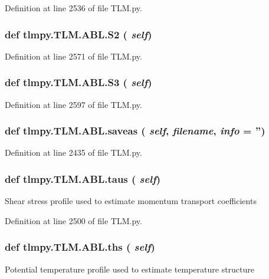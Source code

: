 Definition at line 2536 of file TLM.py.\hypertarget{classtlmpy_1_1TLM_1_1ABL_aa9ff1ee6dd176f30fde1965055b965cf}{
\subsubsection[{S2}]{\setlength{\rightskip}{0pt plus 5cm}def tlmpy.TLM.ABL.S2 ( {\em self})}}
\label{classtlmpy_1_1TLM_1_1ABL_aa9ff1ee6dd176f30fde1965055b965cf}


Definition at line 2571 of file TLM.py.\hypertarget{classtlmpy_1_1TLM_1_1ABL_a5bf1aecd82b5b9916ecebedf39a66aa0}{
\subsubsection[{S3}]{\setlength{\rightskip}{0pt plus 5cm}def tlmpy.TLM.ABL.S3 ( {\em self})}}
\label{classtlmpy_1_1TLM_1_1ABL_a5bf1aecd82b5b9916ecebedf39a66aa0}


Definition at line 2597 of file TLM.py.\hypertarget{classtlmpy_1_1TLM_1_1ABL_a89ac6588f29d2fbd994e80bc25e93ae1}{
\subsubsection[{saveas}]{\setlength{\rightskip}{0pt plus 5cm}def tlmpy.TLM.ABL.saveas ( {\em self}, \/   {\em filename}, \/   {\em info} = {\ttfamily ''})}}
\label{classtlmpy_1_1TLM_1_1ABL_a89ac6588f29d2fbd994e80bc25e93ae1}


Definition at line 2435 of file TLM.py.\hypertarget{classtlmpy_1_1TLM_1_1ABL_a6338c7ead7584dd22d6937be000359e3}{
\subsubsection[{taus}]{\setlength{\rightskip}{0pt plus 5cm}def tlmpy.TLM.ABL.taus ( {\em self})}}
\label{classtlmpy_1_1TLM_1_1ABL_a6338c7ead7584dd22d6937be000359e3}
\begin{DoxyVerb}Shear stress profile used to estimate
momentum transport coefficients\end{DoxyVerb}
 

Definition at line 2500 of file TLM.py.\hypertarget{classtlmpy_1_1TLM_1_1ABL_a069e56f520ef732186e6eea00e147e2e}{
\subsubsection[{ths}]{\setlength{\rightskip}{0pt plus 5cm}def tlmpy.TLM.ABL.ths ( {\em self})}}
\label{classtlmpy_1_1TLM_1_1ABL_a069e56f520ef732186e6eea00e147e2e}
\begin{DoxyVerb}Potential temperature profile used to estimate
temperature structure\end{DoxyVerb}
 

